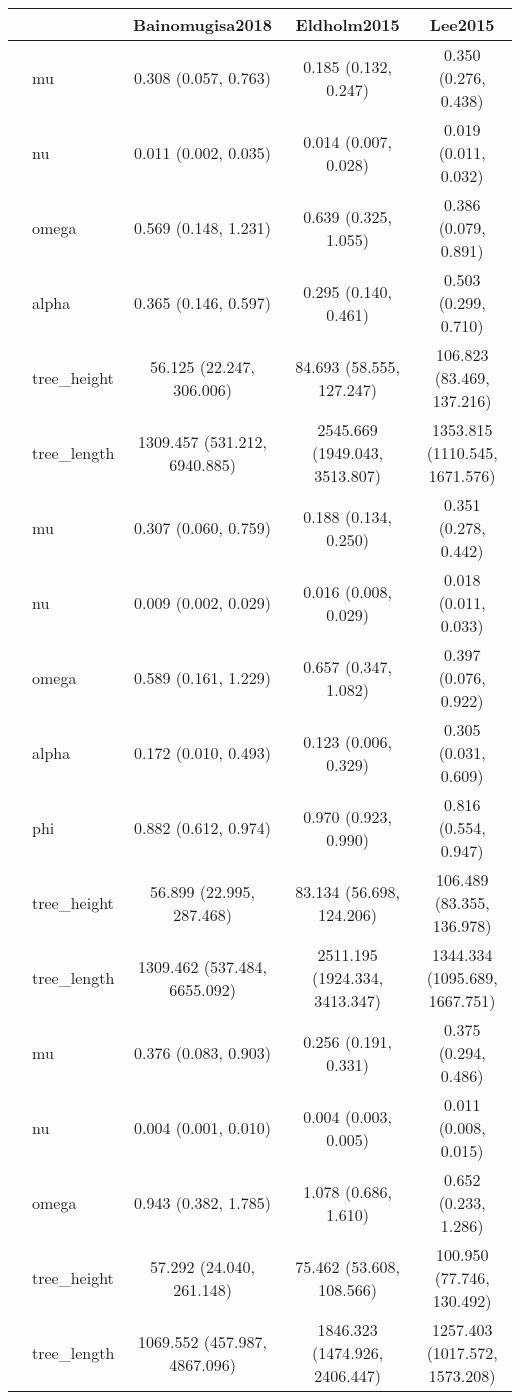 \begingroup
\fontsize{5.2pt}{6.3pt}\selectfont
\begin{longtable}{l|l|ccc}
\toprule
\multicolumn{2}{c}{} & Bainomugisa2018 & Eldholm2015 & Lee2015 \\ 
\midrule\addlinespace[2.5pt]
\multirow{6}{=}{Beta} & mu & 0.308 (0.057, 0.763) & 0.185 (0.132, 0.247) & 0.350 (0.276, 0.438) \\ 
 & nu & 0.011 (0.002, 0.035) & 0.014 (0.007, 0.028) & 0.019 (0.011, 0.032) \\ 
 & omega & 0.569 (0.148, 1.231) & 0.639 (0.325, 1.055) & 0.386 (0.079, 0.891) \\ 
 & alpha & 0.365 (0.146, 0.597) & 0.295 (0.140, 0.461) & 0.503 (0.299, 0.710) \\ 
 & tree\_height & 56.125 (22.247, 306.006) & 84.693 (58.555, 127.247) & 106.823 (83.469, 137.216) \\ 
 & tree\_length & 1309.457 (531.212, 6940.885) & 2545.669 (1949.043, 3513.807) & 1353.815 (1110.545, 1671.576) \\ 
\midrule\addlinespace[2.5pt]
\multirow{7}{=}{Extended beta} & mu & 0.307 (0.060, 0.759) & 0.188 (0.134, 0.250) & 0.351 (0.278, 0.442) \\ 
 & nu & 0.009 (0.002, 0.029) & 0.016 (0.008, 0.029) & 0.018 (0.011, 0.033) \\ 
 & omega & 0.589 (0.161, 1.229) & 0.657 (0.347, 1.082) & 0.397 (0.076, 0.922) \\ 
 & alpha & 0.172 (0.010, 0.493) & 0.123 (0.006, 0.329) & 0.305 (0.031, 0.609) \\ 
 & phi & 0.882 (0.612, 0.974) & 0.970 (0.923, 0.990) & 0.816 (0.554, 0.947) \\ 
 & tree\_height & 56.899 (22.995, 287.468) & 83.134 (56.698, 124.206) & 106.489 (83.355, 136.978) \\ 
 & tree\_length & 1309.462 (537.484, 6655.092) & 2511.195 (1924.334, 3413.347) & 1344.334 (1095.689, 1667.751) \\ 
\midrule\addlinespace[2.5pt]
\multirow{5}{=}{Kingman} & mu & 0.376 (0.083, 0.903) & 0.256 (0.191, 0.331) & 0.375 (0.294, 0.486) \\ 
 & nu & 0.004 (0.001, 0.010) & 0.004 (0.003, 0.005) & 0.011 (0.008, 0.015) \\ 
 & omega & 0.943 (0.382, 1.785) & 1.078 (0.686, 1.610) & 0.652 (0.233, 1.286) \\ 
 & tree\_height & 57.292 (24.040, 261.148) & 75.462 (53.608, 108.566) & 100.950 (77.746, 130.492) \\ 
 & tree\_length & 1069.552 (457.987, 4867.096) & 1846.323 (1474.926, 2406.447) & 1257.403 (1017.572, 1573.208) \\ 
\bottomrule
\end{longtable}
\endgroup

